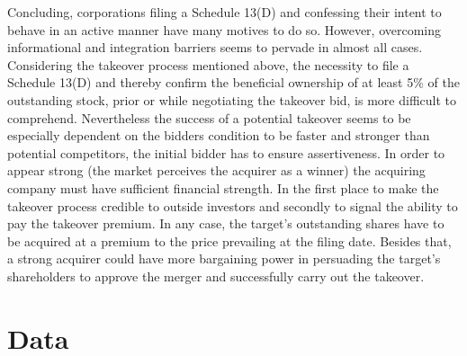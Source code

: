 \documentclass[12pt]{article}
\begin{document}
Concluding, corporations filing a Schedule 13(D) and confessing their intent to behave in an active manner have many motives to do so. However, overcoming informational and integration barriers seems to pervade in almost all cases. Considering the takeover process mentioned above, the necessity to file a Schedule 13(D) and thereby confirm the beneficial ownership of at least 5\% of the outstanding stock, prior or while negotiating the takeover bid, is more difficult to comprehend. 
Nevertheless the success of a potential takeover seems to be especially dependent on the bidders condition to be faster and stronger than potential competitors, the initial bidder has to ensure assertiveness. In order to appear strong (the market perceives the acquirer as a winner) the acquiring company must have sufficient financial strength. In the first place to make the takeover process credible to outside investors and secondly to signal the ability to pay the takeover premium. In any case, the target's outstanding shares have to be acquired at a premium to the price prevailing at the filing date. Besides that, a strong acquirer could have more bargaining power in persuading the target's shareholders to approve the merger and successfully carry out the takeover. 









\section{Data}
\end{document}
